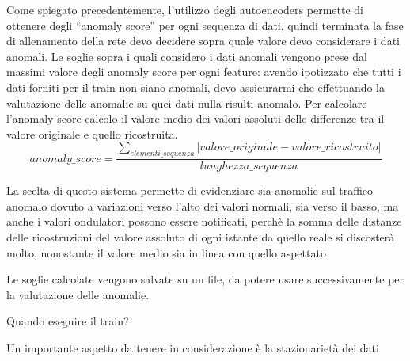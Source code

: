 Come spiegato precedentemente, l'utilizzo degli autoencoders permette di ottenere degli ``anomaly score'' per ogni sequenza di dati, quindi terminata la fase di allenamento della rete devo decidere sopra quale valore devo considerare i dati anomali.
Le soglie sopra i quali considero i dati anomali vengono prese dal massimi valore degli anomaly score per ogni feature: avendo ipotizzato che tutti i dati forniti per il train non siano anomali, devo assicurarmi che effettuando la valutazione delle anomalie su quei dati nulla risulti anomalo.
Per calcolare l'anomaly score calcolo il valore medio dei valori assoluti delle differenze tra il valore originale e quello ricostruita.
\begin{equation}
    anomaly\_score = \frac{\sum_{elementi\_sequenza}\lvert valore\_originale - valore\_ricostruito \rvert}{lunghezza\_sequenza}
\end{equation}

La scelta di questo sistema permette di evidenziare sia anomalie sul traffico anomalo dovuto a variazioni verso l'alto dei valori normali, sia verso il basso, ma anche i valori ondulatori possono essere notificati, perchè la somma delle distanze delle ricostruzioni del valore assoluto di ogni istante da quello reale si discosterà molto, nonostante il valore medio sia in linea con quello aspettato.

Le soglie calcolate vengono salvate su un file, da potere usare successivamente per la valutazione delle anomalie.

Quando eseguire il train?

Un importante aspetto da tenere in considerazione è la stazionarietà dei dati






